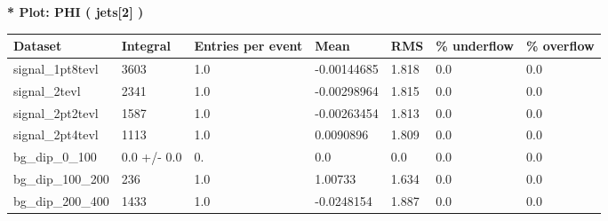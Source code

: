 \documentclass[a4paper, 10pt]{article}
\begin{document}
\textbf{* Plot: PHI ( jets[2] ) }\\
   \begin{table}[H]
  \begin{center}
    \begin{tabular}{|m{23.0mm}|m{23.0mm}|m{18.0mm}|m{19.0mm}|m{19.0mm}|m{19.0mm}|m{19.0mm}|}
      \hline
      {\cellcolor{yellow}         Dataset}& {\cellcolor{yellow}         Integral}& {\cellcolor{yellow}         Entries per event}& {\cellcolor{yellow}         Mean}& {\cellcolor{yellow}         RMS}& {\cellcolor{yellow}         \% underflow}& {\cellcolor{yellow}         \% overflow}\\
      \hline
      {\cellcolor{white}         signal\_1pt8tevl}& {\cellcolor{white}         3603}& {\cellcolor{white}         1.0}& {\cellcolor{white}         -0.00144685}& {\cellcolor{white}         1.818}& {\cellcolor{green}         0.0}& {\cellcolor{green}         0.0}\\
      \hline
      {\cellcolor{white}         signal\_2tevl}& {\cellcolor{white}         2341}& {\cellcolor{white}         1.0}& {\cellcolor{white}         -0.00298964}& {\cellcolor{white}         1.815}& {\cellcolor{green}         0.0}& {\cellcolor{green}         0.0}\\
      \hline
      {\cellcolor{white}         signal\_2pt2tevl}& {\cellcolor{white}         1587}& {\cellcolor{white}         1.0}& {\cellcolor{white}         -0.00263454}& {\cellcolor{white}         1.813}& {\cellcolor{green}         0.0}& {\cellcolor{green}         0.0}\\
      \hline
      {\cellcolor{white}         signal\_2pt4tevl}& {\cellcolor{white}         1113}& {\cellcolor{white}         1.0}& {\cellcolor{white}         0.0090896}& {\cellcolor{white}         1.809}& {\cellcolor{green}         0.0}& {\cellcolor{green}         0.0}\\
      \hline
      {\cellcolor{white}         bg\_dip\_0\_100}& {\cellcolor{white}         0.0 +/\-- 0.0}& {\cellcolor{white}         0.}& {\cellcolor{white}         0.0}& {\cellcolor{white}         0.0}& {\cellcolor{green}         0.0}& {\cellcolor{green}         0.0}\\
      \hline
      {\cellcolor{white}         bg\_dip\_100\_200}& {\cellcolor{white}         236}& {\cellcolor{white}         1.0}& {\cellcolor{white}         1.00733}& {\cellcolor{white}         1.634}& {\cellcolor{green}         0.0}& {\cellcolor{green}         0.0}\\
      \hline
      {\cellcolor{white}         bg\_dip\_200\_400}& {\cellcolor{white}         1433}& {\cellcolor{white}         1.0}& {\cellcolor{white}         -0.0248154}& {\cellcolor{white}         1.887}& {\cellcolor{green}         0.0}& {\cellcolor{green}         0.0}\\

\end{tabular}
\end{center}
\end{table}
\end{document}
